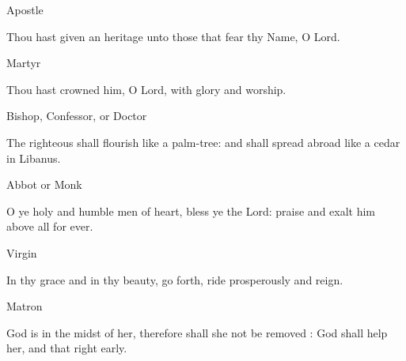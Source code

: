 \begin{multicols}{2}
\centerline{\color{RubricRed}\small%
Apostle}
\par\noindent
Thou hast given an heritage unto those that fear thy Name, O Lord.\\

\centerline{\color{RubricRed}\small%
Martyr}
\par\noindent
Thou hast crowned him, O Lord, with glory and worship.\\

\centerline{\color{RubricRed}\small%
Bishop, Confessor, or Doctor}
\par\noindent
The righteous shall flourish like a palm-tree: and shall spread abroad like a cedar in Libanus.%

\centerline{\color{RubricRed}\small%
Abbot or Monk}
\par\noindent
O ye holy and humble men of heart, bless ye the Lord: praise and exalt him above all for ever.\\

\centerline{\color{RubricRed}\small%
Virgin}
\par\noindent
In thy grace and in thy beauty, go forth, ride prosperously and reign.\\

\centerline{\color{RubricRed}\small%
Matron}
\par\noindent
God is in the midst of her, therefore shall she not be removed : God shall help her, and that right early.%


\end{multicols}
